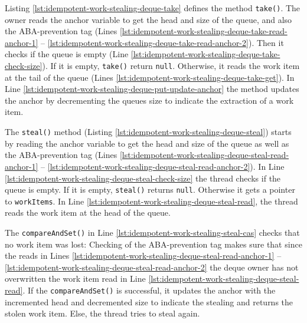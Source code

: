 

Listing \ref{lst:idempotent-work-stealing-deque-take} defines the
method \lstinline!take()!. The owner reads the anchor variable to get
the head and size of the queue, and also the ABA-prevention tag (Lines
\ref{lst:idempotent-work-stealing-deque-take-read-anchor-1} --
\ref{lst:idempotent-work-stealing-deque-take-read-anchor-2}). Then it
checks if the queue is empty (Line
\ref{lst:idempotent-work-stealing-deque-take-check-size}). If it is
empty, \lstinline!take()! return \lstinline!null!. Otherwise, it reads
the work item at the tail of the queue (Lines
\ref{lst:idempotent-work-stealing-deque-take-get}). In Line
\ref{lst:idempotent-work-stealing-deque-put-update-anchor} the method
updates the anchor by decrementing the queues size to indicate the
extraction of a work item.



The \lstinline!steal()! method (Listing
\ref{lst:idempotent-work-stealing-deque-steal}) starts by reading the
anchor variable to get the head and size of the queue as well as the
ABA-prevention tag (Lines
\ref{lst:idempotent-work-stealing-deque-steal-read-anchor-1} --
\ref{lst:idempotent-work-stealing-deque-steal-read-anchor-2}). In Line
\ref{lst:idempotent-work-stealing-deque-steal-check-size} the thread
checks if the queue is empty. If it is empty, \lstinline!steal()!
returns \lstinline!null!. Otherwise it gets a pointer to
\lstinline!workItems!. In Line
\ref{lst:idempotent-work-stealing-deque-steal-read}, the thread reads
the work item at the head of the queue.

The \lstinline!compareAndSet()! in Line
\ref{lst:idempotent-work-stealing-steal-cas} checks that no work item
was lost: Checking of the ABA-prevention tag makes sure that since the
reads in Lines
\ref{lst:idempotent-work-stealing-deque-steal-read-anchor-1} --
\ref{lst:idempotent-work-stealing-deque-steal-read-anchor-2} the deque
owner has not overwritten the work item read in Line
\ref{lst:idempotent-work-stealing-deque-steal-read}. If the
\lstinline!compareAndSet()! is successful, it updates the anchor with
the incremented head and decremented size to indicate the stealing and
returns the stolen work item. Else, the thread tries to steal again.

